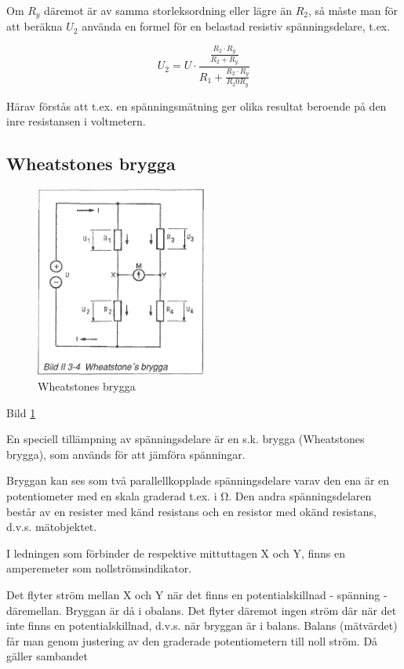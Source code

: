 Om \(R_y\) däremot är av samma storleksordning eller lägre än \(R_2\), så måste
man för att beräkna \(U_2\) använda en formel för en belastad resistiv
spänningsdelare, t.ex.

\[
U_2 = U \cdot \frac{ \frac{R_2 \cdot R_y}{R_2 + R_y} }{ R_1 + \frac{R_2 \cdot R_y}{R_2 0 R_y} }
\]

Härav förstås att t.ex. en spänningsmätning ger olika resultat beroende på den
inre resistansen i voltmetern.

\subsection{Wheatstones brygga}

\begin{figure}
\includegraphics[width=0.5\textwidth]{images/bild_2_3-04}
\caption{Wheatstones brygga}
\label{fig:BildII3-04}
\end{figure}

Bild \ref{fig:BildII3-04}

En speciell tillämpning av spänningsdelare är en s.k. brygga (Wheatstones
brygga), som används för att jämföra spänningar.

Bryggan kan ses som två parallellkopplade spänningsdelare varav den ena är en
potentiometer med en skala graderad t.ex. i Ω. Den andra spänningsdelaren består
av en resister med känd resistans och en resistor med okänd resistans, d.v.s.
mätobjektet.

I ledningen som förbinder de respektive mittuttagen X och Y, finns en
amperemeter som nollströmsindikator.


Det flyter ström mellan X och Y när det finns en potentialskillnad - spänning -
däremellan. Bryggan är då i obalans. Det flyter däremot ingen ström där när det
inte finns en potentialskillnad, d.v.s. när bryggan är i balans. Balans
(mätvärdet) får man genom justering av den graderade potentiometern till noll
ström. Då gäller sambandet

